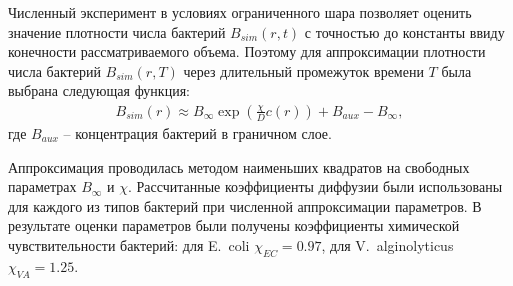 Численный эксперимент в условиях ограниченного шара позволяет оценить значение плотности числа бактерий $B_{sim}(r, t)$ с точностью до константы ввиду конечности рассматриваемого объема. Поэтому для аппроксимации плотности числа бактерий $B_{sim}(r, T)$ через длительный промежуток времени $T$ была выбрана следующая функция:
\begin{equation}
    \begin{aligned}
        B_{sim}(r) \approx B_{\infty} \exp \left ( \frac{\chi}{D}c(r) \right ) + B_{aux} - B_{\infty},
    \label{eq:keller-sigel-stationary-solution-approx}
    \end{aligned}
\end{equation}
где $B_{aux}$ -- концентрация бактерий в граничном слое.

Аппроксимация проводилась методом наименьших квадратов на свободных параметрах $B_{\infty}$ и $\chi$. Рассчитанные коэффициенты диффузии были использованы для каждого из типов бактерий при численной аппроксимации параметров. В результате оценки параметров были получены коэффициенты химической чувствительности бактерий: для E.~coli $\chi_{EC}=0.97$, для V.~alginolyticus $\chi_{VA}=1.25$.

